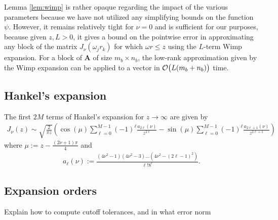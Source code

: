 Lemma \ref{lem:wimp} is rather opaque regarding the impact of the various
parameters because we have not utilized any simplifying bounds on the function
$\psi$. However, it remains relatively tight for $\nu = 0$ and is sufficient for
our purposes, because given $z, L > 0$, it gives a bound on the pointwise error
in approximating any block of the matrix $J_\nu(\omega_j r_k)$ for which $\omega
r \leq z$ using the $L$-term Wimp expansion. For a block of $\bm{A}$ of size
$m_b \times n_b$, the low-rank approximation given by the Wimp expansion can be
applied to a vector in $\mathcal{O}\big(L(m_b + n_b)\big)$ time.

\subsection{Hankel's expansion}
\label{sec:asymptotic}

The first $2M$ terms of Hankel's expansion for $z \to \infty$ are given by
\begin{align} \label{eq:asymptotic-expansion}
    J_\nu(z)
    \sim \sqrt{\frac{2}{\pi z}} \left( 
        \cos\left(\mu\right) \sum_{\ell=0}^{M-1} (-1)^\ell \frac{a_{2\ell}(\nu)}{z^{2\ell}}
        - \sin\left(\mu\right) \sum_{\ell=0}^{M-1} (-1)^\ell \frac{a_{2\ell+1}(\nu)}{z^{2\ell+1}}
        \right)
\end{align}
where $\mu := z - \frac{(2\nu+1)\pi}{4}$ and 
\begin{align}
    a_\ell(\nu) := \frac{(4\nu^2 - 1)(4\nu^2 - 3)\dots(4\nu^2 - (2\ell-1)^2)}{\ell! 8^\ell}.
\end{align}







\subsection{Expansion orders}
\label{sec:cutoff}

Explain how to compute cutoff tolerances, and in what error norm



